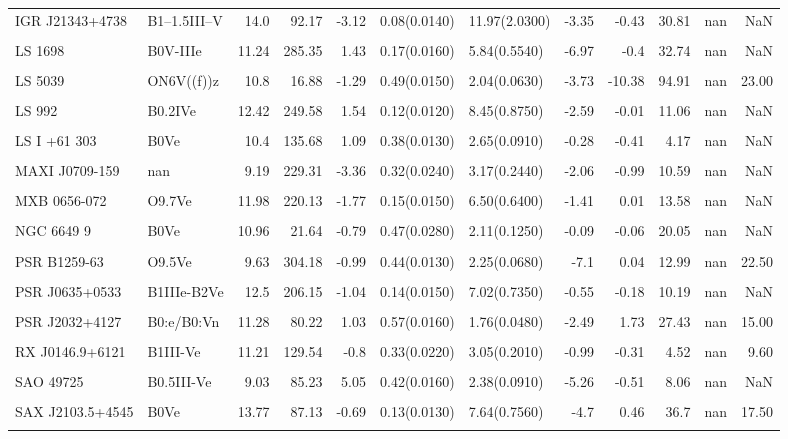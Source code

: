 \begin{longtable}{llrrrllrrrrr}
IGR J21343+4738 & B1--1.5III--V & 14.0 & 92.17 & -3.12 & 0.08(0.0140) & 11.97(2.0300) & -3.35 & -0.43 & 30.81 & nan & NaN \\ \\
LS 1698 & B0V-IIIe & 11.24 & 285.35 & 1.43 & 0.17(0.0160) & 5.84(0.5540) & -6.97 & -0.4 & 32.74 & nan & NaN \\ \\
LS 5039 & ON6V((f))z & 10.8 & 16.88 & -1.29 & 0.49(0.0150) & 2.04(0.0630) & -3.73 & -10.38 & 94.91 & nan & 23.00 \\ \\
LS 992 & B0.2IVe & 12.42 & 249.58 & 1.54 & 0.12(0.0120) & 8.45(0.8750) & -2.59 & -0.01 & 11.06 & nan & NaN \\ \\
LS I +61 303 & B0Ve & 10.4 & 135.68 & 1.09 & 0.38(0.0130) & 2.65(0.0910) & -0.28 & -0.41 & 4.17 & nan & NaN \\ \\
MAXI J0709-159 & nan & 9.19 & 229.31 & -3.36 & 0.32(0.0240) & 3.17(0.2440) & -2.06 & -0.99 & 10.59 & nan & NaN \\ \\
MXB 0656-072 & O9.7Ve & 11.98 & 220.13 & -1.77 & 0.15(0.0150) & 6.50(0.6400) & -1.41 & 0.01 & 13.58 & nan & NaN \\ \\
NGC 6649 9 & B0Ve & 10.96 & 21.64 & -0.79 & 0.47(0.0280) & 2.11(0.1250) & -0.09 & -0.06 & 20.05 & nan & NaN \\ \\
PSR B1259-63 & O9.5Ve & 9.63 & 304.18 & -0.99 & 0.44(0.0130) & 2.25(0.0680) & -7.1 & 0.04 & 12.99 & nan & 22.50 \\ \\
PSR J0635+0533 & B1IIIe-B2Ve & 12.5 & 206.15 & -1.04 & 0.14(0.0150) & 7.02(0.7350) & -0.55 & -0.18 & 10.19 & nan & NaN \\ \\
PSR J2032+4127 & B0:e/B0:Vn & 11.28 & 80.22 & 1.03 & 0.57(0.0160) & 1.76(0.0480) & -2.49 & 1.73 & 27.43 & nan & 15.00 \\ \\
RX J0146.9+6121 & B1III-Ve & 11.21 & 129.54 & -0.8 & 0.33(0.0220) & 3.05(0.2010) & -0.99 & -0.31 & 4.52 & nan & 9.60 \\ \\
SAO 49725 & B0.5III-Ve & 9.03 & 85.23 & 5.05 & 0.42(0.0160) & 2.38(0.0910) & -5.26 & -0.51 & 8.06 & nan & NaN \\ \\
SAX J2103.5+4545 & B0Ve & 13.77 & 87.13 & -0.69 & 0.13(0.0130) & 7.64(0.7560) & -4.7 & 0.46 & 36.7 & nan & 17.50 \\ \\

\end{longtable}
